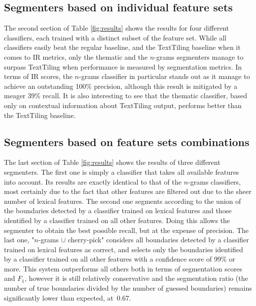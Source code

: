 \subsection{Segmenters based on individual feature sets}

The second section of Table \ref{fig:results} shows the results for four different classifiers, each trained with a distinct subset of the feature set. While all classifiers easily beat the regular baseline, and the TextTiling baseline when it comes to IR metrics, only the thematic and the $n$-grams segmenters manage to surpass TextTiling when performance is measured by segmentation metrics. In terms of IR scores, the $n$-grams classifier in particular stands out as it manage to achieve an outstanding 100\% precision, although this result is mitigated by a meager 39\% recall. It is also interesting to see that the thematic classifier, based only on contextual information about TextTiling output, performs better than the TextTiling baseline.

\subsection{Segmenters based on feature sets combinations}

The last section of Table \ref{fig:results} shows the results of three different segmenters. The first one is simply a classifier that takes all available features into account. Its results are exactly identical to that of the $n$-grams classifiers, most certainly due to the fact that other features are filtered out due to the sheer number of lexical features. The second one segments according to the union of the boundaries detected by a classifier trained on lexical features and those identified by a classifier trained on all other features. Doing this allows the segmenter to obtain the best possible recall, but at the expense of precision. The last one, "$n$-grams $\cup$ cherry-pick"  considers all boundaries detected by a classifier trained on lexical features as correct, and selects only the boundaries identified by a classifier trained on all other features with a confidence score of 99\% or more. This system outperforms all others both in terms of segmentation scores and $F_1$, however it is still relatively conservative and the segmentation ratio (the number of true boundaries divided by the number of guessed boundaries) remains significantly lower than expected, at~0.67.
